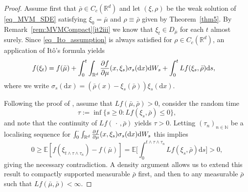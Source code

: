 \documentclass{article}
\theoremstyle{definition}
\numberwithin{equation}{section}
\numberwithin{theorem}{section}
\newcommand{\E}{\mathbb{E}}
\newcommand{\R}{\mathbb{R}}
\newcommand{\dx}{\mathrm{d}x}
\newcommand{\ds}{\mathrm{d}s}
\renewcommand{\d}{{\rm d}}
\newcommand{\N}{{\mathbb N}}
\newcommand{\fdot}{{\,\cdot\,}}
\begin{document}
\begin{proof}
Assume first that $\bar \rho\in C_c({\R^d})$ and let $(\xi,\rho)$ be the weak solution of \eqref{eq_MVM_SDE} satisfying $\xi_0=\bar \mu$ and $\rho\equiv\bar \rho$ given by Theorem~\ref{thm5}. By Remark~\ref{rem:MVMCompact}\ref{it2iii} we know that $\xi_t\in D_{\bar \mu}$ for each $t$ almost surely.
Since \eqref{eq_Ito_assumption} is always satisfied for $\rho\in C_c({\R^d})$, an application of It\^o's formula yields
$$
\begin{aligned}
f(\xi_t) &= f(\bar\mu) + \int_0^t \int_{\R^d} \frac{\partial f}{\partial \mu}(x,\xi_s)\sigma_s(\dx) \d W_s 
+  \int_0^t  Lf(\xi_s, \bar\rho) \ds,
\end{aligned}
$$
where we write $\sigma_s(\dx)=(\bar\rho(x)-\xi_s(\bar \rho))\xi_s(\dx)$. 

Following the proof of \cite[Lemma~2.3]{FL:16}, assume that $Lf(\bar \mu, \bar\rho)>0$, consider the random time
$$\tau:=\inf\{s\geq0\colon Lf(\xi_s,\bar \rho)\leq0\},$$
and note that the continuity of $Lf(\fdot,\bar\rho)$ yields $\tau>0$. Letting $(\tau_n)_{n\in \N}$ be a localising sequence for $\int_0^\cdot \int_{\R^d} \frac{\partial f}{\partial \mu}(x,\xi_s)\sigma_s(\dx) \d W_s$ this implies
$$0\geq\E[f(\xi_{t\land\tau\land\tau_n})-f(\bar \mu)]
=\E\bigg[\int_0^{t\land\tau\land\tau_n}  Lf(\xi_s,\bar \rho) \ds
\bigg]> 0,$$
giving the necessary contradiction. A density argument allows us to extend this result to compactly supported measurable $\bar \rho$ first, and then to any measurable $\bar \rho$ such that $Lf(\bar \mu,\bar  \rho)<\infty$.
\end{proof}
\end{document}
